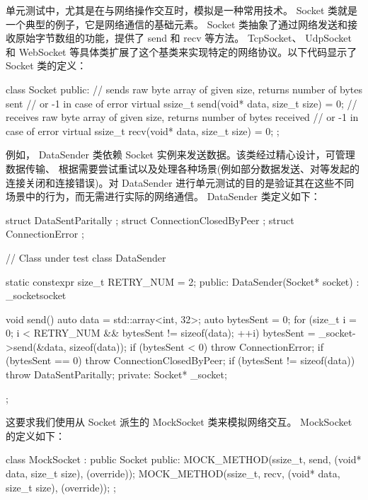 
单元测试中，尤其是在与网络操作交互时，模拟是一种常用技术。 Socket 类就是一个典型的例子，它是网络通信的基础元素。 Socket 类抽象了通过网络发送和接收原始字节数组的功能，提供了 send 和 recv 等方法。 TcpSocket、 UdpSocket 和 WebSocket 等具体类扩展了这个基类来实现特定的网络协议。以下代码显示了 Socket 类的定义：

\begin{cpp}
class Socket {
    public:
    // sends raw byte array of given size, returns number of bytes sent
    // or -1 in case of error
    virtual ssize_t send(void* data, size_t size) = 0;
    // receives raw byte array of given size, returns number of bytes received
    // or -1 in case of error
    virtual ssize_t recv(void* data, size_t size) = 0;
};
\end{cpp}

例如， DataSender 类依赖 Socket 实例来发送数据。该类经过精心设计，可管理数据传输、 根据需要尝试重试以及处理各种场景(例如部分数据发送、对等发起的连接关闭和连接错误)。对 DataSender 进行单元测试的目的是验证其在这些不同场景中的行为，而无需进行实际的网络通信。 DataSender 类定义如下：

\begin{cpp}
struct DataSentParitally {};
struct ConnectionClosedByPeer {};
struct ConnectionError {};

// Class under test
class DataSender {
    static constexpr size_t RETRY_NUM = 2;
public:
    DataSender(Socket* socket) : _socket{socket} {}

    void send() {
        auto data = std::array<int, 32>{};
        auto bytesSent = 0;
        for (size_t i = 0; i < RETRY_NUM && bytesSent != sizeof(data);
        ++i) {
            bytesSent = _socket->send(&data, sizeof(data));
            if (bytesSent < 0) {
                throw ConnectionError{};
            }
            if (bytesSent == 0) {
            throw ConnectionClosedByPeer{};
            }
        }
        if (bytesSent != sizeof(data)) {
            throw DataSentParitally{};
        }
    }
private:
    Socket* _socket;
};
\end{cpp}

这要求我们使用从 Socket 派生的 MockSocket 类来模拟网络交互。 MockSocket 的定义如下：

\begin{cpp}
class MockSocket : public Socket {
public:
    MOCK_METHOD(ssize_t, send, (void* data, size_t size), (override));
    MOCK_METHOD(ssize_t, recv, (void* data, size_t size), (override));
};
\end{cpp}

